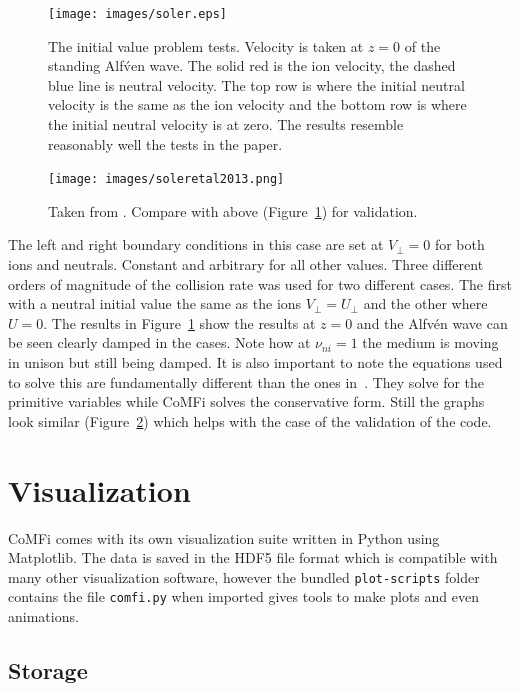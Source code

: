 \documentclass[12pt,upcase]{umlthesis}
\def\code#1{\texttt{#1}}
\begin{document}
\begin{figure}[ht!]
	\centering
	\texttt{[image: images/soler.eps]}
	\caption{The \citet{Soler2013} initial value problem tests. Velocity is taken at $z=0$ of the standing Alf\'ven wave. The solid red is the ion velocity, the dashed blue line is neutral velocity. The top row is where the initial neutral velocity is the same as the ion velocity and the bottom row is where the initial neutral velocity is at zero. The results resemble reasonably well the tests in the \citet{Soler2013} paper.}\label{fig:soler}
\end{figure}

\begin{figure}[ht!]
	\centering
	\texttt{[image: images/soleretal2013.png]}
	\caption{Taken from \citet{Soler2013}. Compare with above (Figure~\ref{fig:soler}) for validation.}\label{fig:soleretal2013}
\end{figure}

The left and right boundary conditions in this case are set at $V_{\perp} = 0$ for both ions and neutrals. Constant and arbitrary for all other values. Three different orders of magnitude of the collision rate was used for two different cases. The first with a neutral initial value the same as the ions $V_{\perp} = U_{\perp}$ and the other where $U=0$. The results in Figure~\ref{fig:soler} show the results at $z=0$ and the Alfv\'en wave can be seen clearly damped in the cases. Note how at $\nu_{ni}=1$ the medium is moving in unison but still being damped. It is also important to note the equations used to solve this are fundamentally different than the ones in~\citet{Soler2013}. They solve for the primitive variables while CoMFi solves the conservative form. Still the graphs look similar (Figure~\ref{fig:soleretal2013}) which helps with the case of the validation of the code.
\section{Visualization}\label{sec:visualization} 

CoMFi comes with its own visualization suite written in Python using Matplotlib. The data is saved in the HDF5 file format which is compatible with many other visualization software, however the bundled \code{plot-scripts} folder contains the file \code{comfi.py} when imported gives tools to make plots and even animations.

\subsection{Storage}
\end{document}
